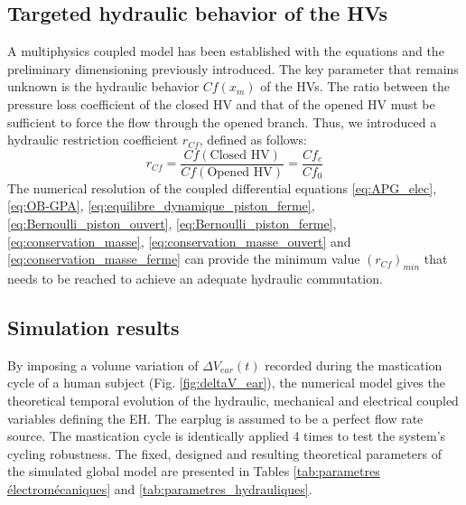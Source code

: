 \documentclass[3p,twocolumn,preprint]{elsarticle}
\begin{document}
	\subsection{Targeted hydraulic behavior of the HVs}	
	\label{subsec:HV hydraulic targeted behaviour}
A multiphysics coupled model has been established with the equations and the preliminary dimensioning previously introduced. The key parameter that remains unknown is the hydraulic behavior $Cf(x_m)$ of the HVs. The ratio between the pressure loss coefficient of the closed HV and that of the opened HV must be sufficient to force the flow through the opened branch. Thus, we introduced a hydraulic restriction coefficient $r_{Cf}$, defined as follows:
\begin{equation}
	r_{Cf} = \dfrac{Cf(\text{Closed HV})}{Cf(\text{Opened HV})}	= \dfrac{Cf_c}{Cf_0}	
	\label{eq:r_Cf_definition}
\end{equation}
The numerical resolution of the coupled differential equations \ref{eq:APG_elec},\ref{eq:OB-GPA}, \ref{eq:equilibre_dynamique_piston_ferme}, \ref{eq:Bernoulli_piston_ouvert}, \ref{eq:Bernoulli_piston_ferme}, \ref{eq:conservation_masse}, \ref{eq:conservation_masse_ouvert} and \ref{eq:conservation_masse_ferme} can provide the minimum value $(r_{Cf})_{min}$ that needs to be reached to achieve an adequate hydraulic commutation.
	\subsection{Simulation results}	
	\label{subsec:Simulation results}
By imposing a volume variation of $\Delta V_{ear}(t)$ recorded during the mastication cycle of a human subject (Fig. \ref{fig:deltaV_ear}), the numerical model gives the theoretical temporal evolution of the hydraulic, mechanical and electrical coupled variables defining the EH. The earplug is assumed to be a perfect flow rate source. The mastication cycle is identically applied 4 times to test the system's cycling robustness. The fixed, designed and resulting theoretical parameters of the simulated global model are presented in Tables \ref{tab:parametres électromécaniques} and \ref{tab:parametres_hydrauliques}.
\end{document}
